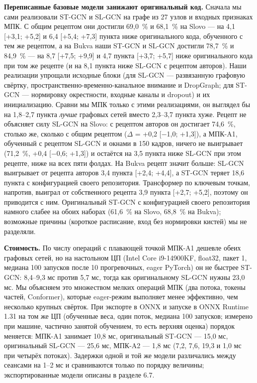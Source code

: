 \documentclass[a4paper,fleqn]{cas-dc}
\begin{document}
\textbf{Переписанные базовые модели занижают оригинальный код.} Сначала мы сами реализовали ST-GCN и SL-GCN на графе из 27 узлов и входных признаках МПК. С общим рецептом они достигли 69,0~\% и 68,1~\% на Slovo --- на 4,1 {[}+3,1; +5,2{]} и 6,4 {[}+5,4; +7,3{]} пункта ниже оригинального кода, обученного с тем же рецептом, а на Bukva наши ST-GCN и SL-GCN достигли 78,7~\% и 84,9~\% --- на 8,7 {[}+7,5; +9,9{]} и 4,7 пункта {[}+3,7; +5,7{]} ниже оригинального кода при том же рецепте (и на 8,1 пункта ниже SL-GCN с рецептом авторов). Наши реализации упрощали исходные блоки (для SL-GCN --- развязанную графовую свёртку, пространственно-временно-канальное внимание и DropGraph; для ST-GCN --- нормировку окрестности, входные каналы и dropout) и их инициализацию. Сравни мы МПК только с этими реализациями, он выглядел бы на 1,8--2,7 пункта \emph{лучше} графовых сетей вместо 2,3--3,7 пункта хуже. Рецепт не объясняет силу SL-GCN на Slovo: с рецептом авторов он достигает 74,6~\%, столько же, сколько с общим рецептом (\(\Delta\) = +0,2 {[}$-$1,0; +1,3{]}), а МПК-A1, обученный с рецептом SL-GCN и окнами в 150 кадров, ничего не выигрывает (71,2~\%, +0,4 {[}$-$0,6; +1,3{]}) и остаётся на 3,5 пункта ниже SL-GCN при этом рецепте, ниже на всех пяти фолдах. На Bukva рецепт значит больше: SL-GCN выигрывает от рецепта авторов 3,4 пункта {[}+2,4; +4,4{]}, а ST-GCN теряет 18,6 пункта с конфигурацией своего репозитория. Трансформер по ключевым точкам, напротив, выиграл от собственного рецепта 3,9 пункта {[}+2,7; +5,2{]}, поэтому он приводится с ним. Оригинальный ST-GCN с конфигурацией своего репозитория намного слабее на обоих наборах (61,6~\% на Slovo, 68,8~\% на Bukva); возможные причины (короткое расписание, вход без нормировки кистей) мы не разделяли.

\textbf{Стоимость.} По числу операций с плавающей точкой МПК-A1 дешевле обеих графовых сетей, но на настольном ЦП (Intel Core i9-14900KF, float32, пакет 1, медиана 100 запусков после 10 прогревочных, eager PyTorch) он не быстрее ST-GCN: 8,4--9,3 мс против 5,7 мс, тогда как оригинальному SL-GCN нужны 23,0 мс. Мы объясняем это множеством мелких операций МПК (два потока, токены частей, Conformer), которые eager-режим выполняет менее эффективно, чем несколько крупных свёрток. При экспорте в ONNX и запуске в ONNX Runtime 1.31 на том же ЦП (обученные веса, один поток, медиана 100 запусков; измерено при машине, частично занятой обучением, то есть верхняя оценка) порядок меняется: МПК-A1 занимает 10,8 мс, оригинальный ST-GCN --- 15,0 мс, оригинальный SL-GCN --- 25,6 мс, МПК-A2 --- 1,8 мс (7,2, 7,6, 19,3 и 1,0 мс при четырёх потоках). Задержки одной и той же модели различались между сеансами на 1--2 мс и сравниваются только по порядку величины; экспортированные модели описаны в разделе 6.7.
\end{document}
